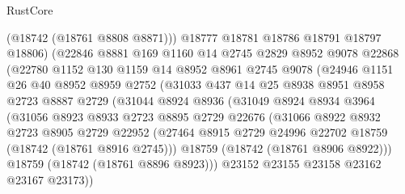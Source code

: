 \begin{lexlean}{RustCore}
\begin{coremodule}
                    (@18742 (@18761 @8808 @8871)))
                  @18777
                  @18781
                  @18786
                  @18791
                  @18797
                  @18806)
                (@22846
                  @8881
                  @169
                  @1160
                  @14
                  @2745
                  @2829
                  @8952
                  @9078
                  @22868
                  (@22780
                    @1152
                    @130
                    @1159
                    @14
                    @8952
                    @8961
                    @2745
                    @9078
                    (@24946
                      @1151
                      @26
                      @40
                      @8952
                      @8959
                      @2752
                      (@31033
                        @437
                        @14
                        @25
                        @8938
                        @8951
                        @8958
                        @2723
                        @8887
                        @2729
                        (@31044
                          @8924
                          @8936
                          (@31049
                            @8924
                            @8934
                            @3964
                            (@31056
                              @8923
                              @8933
                              @2723
                              @8895
                              @2729
                              @22676
                              (@31066
                                @8922
                                @8932
                                @2723
                                @8905
                                @2729
                                @22952
                                (@27464
                                  @8915
                                  @2729
                                  @24996
                                  @22702
                                  @18759
                                  (@18742 (@18761 @8916 @2745)))
                                @18759
                                (@18742 (@18761 @8906 @8922)))
                              @18759
                              (@18742 (@18761 @8896 @8923)))
                            @23152
                            @23155
                            @23158
                            @23162
                            @23167
                            @23173))

\end{coremodule}
\end{lexlean}
